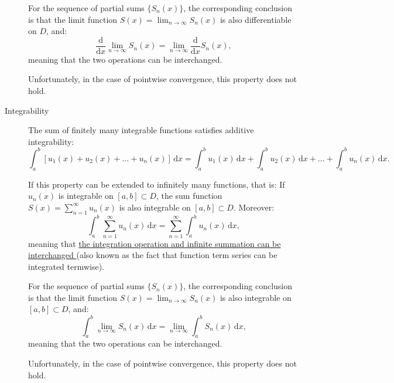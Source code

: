 \documentclass[11pt]{../../TexTemplate/elegantbook}
\begin{document}
\begin{description}
    For the sequence of partial sums \( \{ S_n(x) \} \), 
    the corresponding conclusion is that the limit function 
    \( S(x) = \lim_{n \to \infty} S_n(x) \) is also differentiable on \( D \), and:
    \[
    \frac{\mathrm{d}}{\mathrm{d}x} \lim_{n \to \infty} S_n(x) = \lim_{n \to \infty} \frac{\mathrm{d}}{\mathrm{d}x} S_n(x),
    \]
    meaning that the two operations can be interchanged.

    Unfortunately, in the case of pointwise convergence, this property \textcolor{red!70}{does not hold}.


    \item[Integrability]
    The sum of finitely many integrable functions satisfies additive integrability:
    \[
    \int_a^b [u_1(x) + u_2(x) + \dots + u_n(x)] \, \mathrm{d}x 
    = \int_a^b u_1(x) \, \mathrm{d}x + \int_a^b u_2(x) \, \mathrm{d}x + \dots + \int_a^b u_n(x) \, \mathrm{d}x.
    \]

    If this property can be extended to infinitely many functions, that is:
    If \( u_n(x) \) is integrable on \( [a, b] \subset D \), 
    the sum function \( S(x) = \sum_{n=1}^\infty u_n(x) \) is also integrable on \( [a, b] \subset D \). Moreover:
    \[
    \int_a^b \sum_{n=1}^\infty u_n(x) \, \mathrm{d}x = \sum_{n=1}^\infty \int_a^b u_n(x) \, \mathrm{d}x,
    \]
    meaning that \underline{the integration operation and infinite summation can be interchanged }
    (also known as the fact that function term series can be integrated termwise).

    For the sequence of partial sums \( \{ S_n(x) \} \), 
    the corresponding conclusion is that the limit function \( S(x) = \lim_{n \to \infty} S_n(x) \) is also integrable on \( [a, b] \subset D \), and:
    \[
    \int_a^b \lim_{n \to \infty} S_n(x) \, \mathrm{d}x = \lim_{n \to \infty} \int_a^b S_n(x) \, \mathrm{d}x,
    \]
    meaning that the two operations can be interchanged.

    Unfortunately, in the case of pointwise convergence, this property \textcolor{red!70}{does not hold}.
\end{description}
\end{document}
